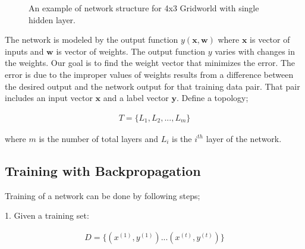 \documentclass{ituphdreport}
\begin{document}
\begin{figure}[h]
	\begin{center}
	\end{center}
	\caption{An example of network structure for 4x3 Gridworld with single hidden layer.
		\label{fig:networkstructure}}
\end{figure}

The network is modeled by the output function $y(\textbf{x},\textbf{w})$ where $\textbf{x}$ is vector of inputs and $\textbf{w}$ is vector of weights. The output function $y$ varies with changes in the weights. Our goal is to find the weight vector that minimizes the error. The error is due to the improper values of weights results from a difference between the desired output and the network output for that training data pair. That pair includes an input vector $\textbf{x}$ and a label vector $\textbf{y}$. Define a topology;

\begin{equation}
\begin{aligned}
T=\{L_1, L_2, ..., L_m \}
\end{aligned}
\end{equation}

where $m$ is the number of total layers and $ L_i $  is the $ i^{th} $  layer of the network.

\subsection{Training with Backpropagation}
Training of a network can be done by following steps;

1. Given a training set:

\begin{equation}
\begin{aligned}
D = \{(x^{(1)} ,y^{(1)}) ... (x^{(t)} ,y^{(t)})\}
\end{aligned}
\end{equation}
\end{document}

